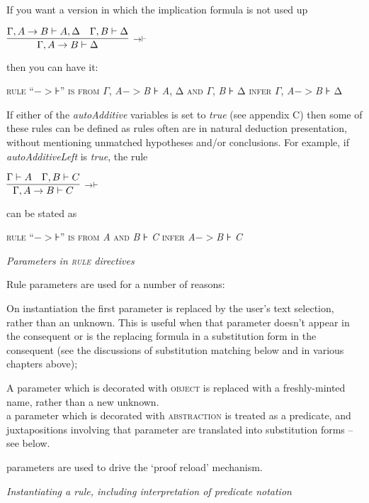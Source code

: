 \documentclass[11pt]{book}
\newcommand{\tab}{\hspace{5mm}}
\newcommand{\reason}[1]{\scalebox{0.85}{#1}}
\begin{document}
If you want a version in which the implication formula is not used up


$\infer[\reason{$->|- $}]
       {\Gamma,A->B |- \Delta }
       {\Gamma,A->B |- A,\Delta \quad \Gamma,B |- \Delta }$

then you can have it:


\textsc{rule} ``\ensuremath{->}⊦'' \textsc{is from} \textsc{\ensuremath{\Gamma}}, \textit{A}\ensuremath{->}\textit{B} \textsc{⊦} \textit{A}, Δ \textsc{and} \textsc{\ensuremath{\Gamma}}\textsc{,} \textit{B} ⊦ Δ \textsc{infer} \textsc{\ensuremath{\Gamma}}, \textit{A}\ensuremath{->}\textit{B} ⊦ Δ


If either of the \textit{autoAdditive} variables is set to \textit{true} (see appendix C) then some of these rules can be defined as rules often are in natural deduction presentation, without mentioning unmatched hypotheses and/or conclusions. For example, if \textit{autoAdditiveLeft} is \textit{true}, the rule


$\infer[\reason{$->|- $}]
       {\Gamma,A->B |- C}
       {\Gamma  |- A\quad \Gamma,B |- C}$

can be stated as


\textsc{rule} ``\ensuremath{->}⊦'' \textsc{is from} \textit{A} \textsc{and} \textit{B} ⊦ \textit{C} \textsc{infer} \textit{A}\ensuremath{->}\textit{B} ⊦ \textit{C}


\textit{Parameters in \textsc{rule} directives}


Rule parameters are used for a number of reasons:


{\textbullet}\tab On instantiation the first parameter is replaced by the user's text selection, rather than an unknown. This is useful when that parameter doesn't appear in the consequent or is the replacing formula in a substitution form in the consequent (see the discussions of substitution matching below and in various chapters above);


{\textbullet}\tab A parameter which is decorated with \textsc{object} is replaced with a freshly-minted name, rather than a new unknown.\\
{\textbullet}\tab a parameter which is decorated with \textsc{abstraction} is treated as a predicate, and juxtapositions involving that parameter are translated into substitution forms -- see below.


{\textbullet}\tab parameters are used to drive the `proof reload' mechanism.


\textit{Instantiating a rule, including interpretation of predicate notation}
\end{document}
